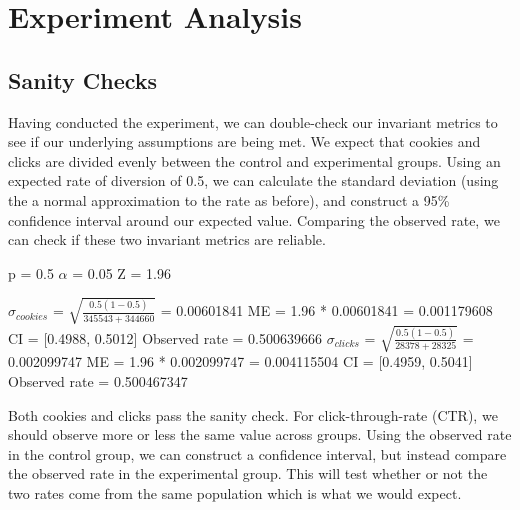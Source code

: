 \documentclass[paper=a4, fontsize=11pt]{scrartcl} %
\numberwithin{equation}{section} %
\numberwithin{figure}{section} %
\numberwithin{table}{section} %
\begin{document}


\section{Experiment Analysis}

\subsection{Sanity Checks}

Having conducted the experiment, we can double-check our invariant metrics to see if our underlying assumptions are being met.  We expect that cookies and clicks are divided evenly between the control and experimental groups.  Using an expected rate of diversion of 0.5, we can calculate the standard deviation (using the a normal approximation to the rate as before), and construct a 95\% confidence interval around our expected value.  Comparing the observed rate, we can check if these two invariant metrics are reliable.\newline

p = 0.5 \newline
$\alpha$ = 0.05 \newline
Z = 1.96
\newline

$\sigma_{cookies}$ = $\sqrt{\frac{0.5 (1 - 0.5)}{345543 + 344660}}$ = 0.00601841 \newline
ME = 1.96 * 0.00601841 = 0.001179608
\newline
CI = [0.4988, 0.5012]
\newline
Observed rate = 0.500639666
\newline
\newline
$\sigma_{clicks}$ = $\sqrt{\frac{0.5 (1 - 0.5)}{28378 + 28325}}$ = 0.002099747
\newline
ME = 1.96 * 0.002099747 = 0.004115504
\newline
CI = [0.4959, 0.5041]
\newline
Observed rate = 0.500467347
\newline

Both cookies and clicks pass the sanity check.  For click-through-rate (CTR), we should observe more or less the same value across groups.  Using the observed rate in the control group, we can construct a confidence interval, but instead compare the observed rate in the experimental group.  This will test whether or not the two rates come from the same population which is what we would expect.
\newline
\end{document}
